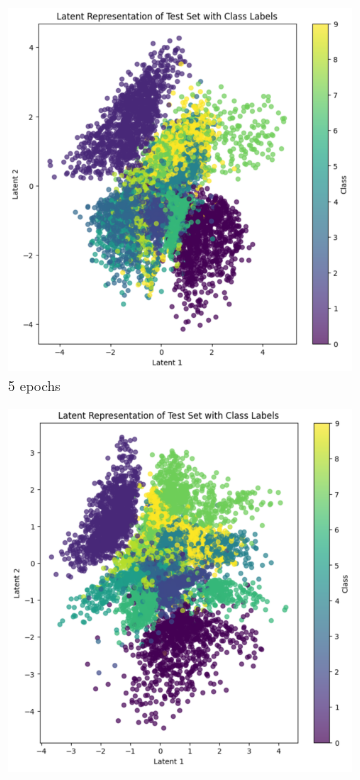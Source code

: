 \begin{figure}[H]
\begin{subfigure}[b]{0.45\textwidth}
        \includegraphics[width=\textwidth]{images/3-latentRep5.png}
        \caption{5 epochs}
        \label{fig:latentRep5}
    \end{subfigure}
    \begin{subfigure}[b]{0.45\textwidth}
        \centering
        \includegraphics[width=\textwidth]{images/3-latentRep25.png}

\end{subfigure}
\end{figure}

